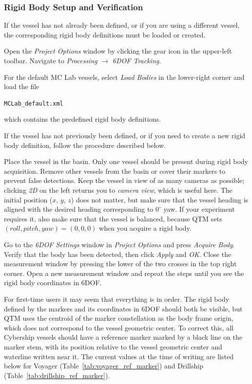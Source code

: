 \documentclass[12pt,a4paper]{article}
\begin{document}
	\subsubsection{Rigid Body Setup and Verification}
	\label{sec:rigidbody}
	
	If the vessel has not already been defined, or if you are using a different vessel, the corresponding rigid body definitions must be loaded or created.
	
	Open the \textit{Project Options} window by clicking the gear icon in the upper-left toolbar. Navigate to \textit{Processing} $\rightarrow$ \textit{6DOF Tracking}.
	
	For the default MC Lab vessels, select \textit{Load Bodies} in the lower-right corner and load the file
	
	\begin{center}
		\texttt{MCLab\_default.xml}
	\end{center}
	
	which contains the predefined rigid body definitions.
	
	If the vessel has not previously been defined, or if you need to create a new rigid body definition, follow the procedure described below.
	
	
	Place the vessel in the basin. Only one vessel should be present during rigid body acquisition. Remove other vessels from the basin or cover their markers to prevent false detections. Keep the vessel in view of as many cameras as possible; clicking \textit{2D} on the left returns you to \textit{camera view}, which is useful here. The initial position ($x$, $y$, $z$) does not matter, but make sure that the vessel heading is aligned with the desired heading corresponding to $0^\circ$ yaw. If your experiment requires it, also make sure that the vessel is balanced, because QTM sets $(roll, pitch, yaw) = (0, 0, 0)$ when you acquire a rigid body. 
	
	Go to the \textit{6DOF Settings} window in \textit{Project Options} and press \textit{Acquire Body}. Verify that the body has been detected, then click \textit{Apply} and \textit{OK}. Close the measurement window by pressing the lower of the two crosses in the top right corner. Open a new measurement window and repeat the steps until you see the rigid body coordinates in 6DOF. 
	
	For first-time users it may seem that everything is in order. The rigid body defined by the markers and its coordinates in 6DOF should both be visible, but QTM uses the centroid of the marker constellation as the body frame origin, which does not correspond to the vessel geometric center. To correct this, all Cybership vessels should have a reference marker marked by a black line on the marker stem, with its position relative to the vessel geometric center and waterline written near it. The current values at the time of writing are listed below for Voyager (Table~\ref{tab:voyager_ref_marker}) and Drillship (Table~\ref{tab:drillship_ref_marker}).
	
\end{document}
